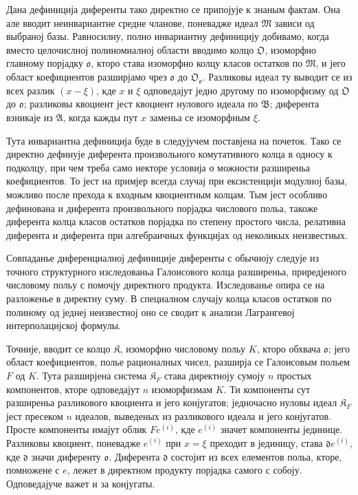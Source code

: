 ﻿\documentclass[11pt]{article}
\begin{document}
Дана дефиниција диференты тако директно се припојује к знаным фактам. Она але вводит неинвариантне средне чланове, поневадже идеал \(\mathfrak M\) зависи од выбраној базы. Равносилну, полно инвариантну дефиницију добивамо, когда вместо целочислној полиномиалној области вводимо колцо \(\mathfrak O\), изоморфно главному порјадку \(\mathfrak o\), кторо става изоморфно колцу класов остатков по \(\mathfrak M\), и јего област коефициентов разширјамо чрез \(\mathfrak o\) до \(\mathfrak O_{\mathfrak o}\). Разликовы идеал ту выводит се из всех разлик \((x-\xi)\), кде \(x\) и \(\xi\) одповедајут једно другому по изоморфизму од \(\mathfrak O\) до \(\mathfrak o\); разликовы квоциент јест квоциент нулового идеала по \(\mathfrak B\); диферента взникаје из \(\mathfrak A\), когда кажды пут \(x\) заменьа се изоморфным \(\xi\).

Тута инвариантна дефиниција буде в следујучем поставјена на почеток. Тако се директно дефинује диферента произвольного комутативного колца в односу к подколцу, при чем треба само некторе условија о можности разширеньа коефициентов. То јест на примјер всегда случај при ексистенцији модулној базы, можливо после прехода к входным квоциентным колцам. Тым јест особливо дефинована и диферента произвольного порјадка числового польа, такоже диферента колца класов остатков порјадка по степену простого числа, релативна диферента и диферента при алгебраичных функцијах од неколикых неизвестных.

Совпаданье диференциалној дефиниције диференты с обычноју следује из точного структурного изследованьа Галоисового колца разширеньа, приредјеного числовому польу с помочју директного продукта. Изследованье опира се на разложенье в директну суму. В специалном случају колца класов остатков по полиному од једнеј неизвестној оно се сводит к анализи Лагрангевој интерполацијској формулы.

Точније, вводит се колцо \(\mathfrak K\), изоморфно числовому польу \(K\), кторо обхвача \(\mathfrak o\); јего област коефициентов, полье рационалных чисел, разширја се Галоисовым польем \(F\) од \(K\). Тута разширјена система \(\mathfrak K_F\) става директноју сумоју \(n\) простых компонентов, кторе одповедајут \(n\) изоморфизмам \(K\). Ти компоненты сут разширеньа разликового квоциента и јего конјугатов; једночасно нуловы идеал \(\mathfrak K_F\) јест пресеком \(n\) идеалов, выведеных из разликового идеала и јего конјугатов. Просте компоненты имајут облик \(Fe^{(i)}\), кде \(e^{(i)}\) значет компоненты јединице. Разликовы квоциент, поневадже \(e^{(i)}\) при \(x=\xi\) преходит в јединицу, става \(\mathfrak d e^{(i)}\), кде \(\mathfrak d\) значи диференту \(\mathfrak o\). Диферента \(\mathfrak d\) состојит из всех елементов польа, кторе, помножене с \(e\), лежет в директном продукту порјадка самого с собоју. Одповедајуче важет и за конјугаты.
\end{document}
